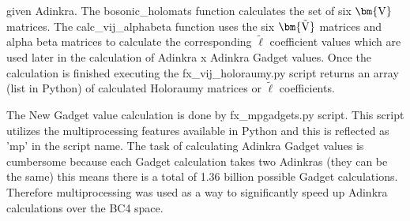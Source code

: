 \documentclass[12pt, letterpaper]{article}
\def\brV{{\bm {\rm V}}}
\def\brtV{{\bm{\tilde{\rm V}}}}
\begin{document}
given Adinkra. The bosonic{\_}holomats function calculates the set of six $\brV$ matrices.
The calc{\_}vij{\_}alphabeta function uses the six $\brtV$ matrices and alpha beta matrices
to calculate the corresponding $\tilde{\ell}$ coefficient values which are used later
in the calculation of Adinkra x Adinkra Gadget values. Once the calculation is finished
executing the fx{\_}vij{\_}holoraumy.py script returns an array (list in Python) of calculated
Holoraumy matrices or $\tilde{\ell}$ coefficients.\par
The New Gadget value calculation is done by fx{\_}mpgadgets.py script. This script utilizes
the multiprocessing features available in Python and this is reflected as 'mp' in the script name.
The task of calculating Adinkra Gadget values is cumbersome because each Gadget calculation
takes two Adinkras (they can be the same) this means there is a total of 1.36 billion possible
Gadget calculations. Therefore multiprocessing was used as a way to significantly speed up
Adinkra calculations over the BC4 space.
\end{document}
